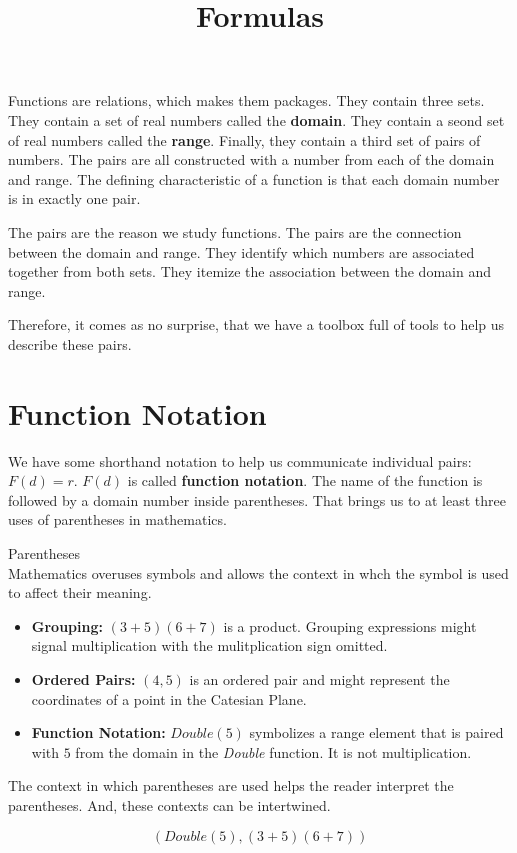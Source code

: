 \documentclass{ximera}
\title{Formulas}
\begin{document}
\begin{abstract}

\end{abstract}
\maketitle


Functions are relations, which makes them packages.  They contain three sets.  They contain a set of real numbers called the \textbf{domain}.  They contain a seond set of real numbers called the \textbf{range}. Finally, they contain a third set of pairs of numbers.  The pairs are all constructed with a number from each of the domain and range. The defining characteristic of a function is that each domain number is in exactly one pair.

The pairs are the reason we study functions.  The pairs are the connection between the domain and range.  They identify which numbers are associated together from both sets. They itemize the association between the domain and range.

Therefore, it comes as no surprise, that we have a toolbox full of tools to help us describe these pairs.


\section{Function Notation}

We have some shorthand notation to help us communicate individual pairs: $F(d) = r$.  $F(d)$ is called \textbf{function notation}. The name of the function is followed by a domain number inside parentheses. That brings us to at least three uses of parentheses in mathematics.

\begin{notation}  Parentheses \\

Mathematics overuses symbols and allows the context in whch the symbol is used to affect their meaning.
	\begin{itemize}
		\item \textbf{Grouping:} $(3+5)(6+7)$ is a product.  Grouping expressions might signal multiplication with the mulitplication sign omitted.
		\item \textbf{Ordered Pairs:} $(4, 5)$ is an ordered pair and might represent the coordinates of a point in the Catesian Plane.
		\item \textbf{Function Notation:} $Double(5)$ symbolizes a range element that is paired with $5$ from the domain in the \textit{Double} function. It is not multiplication.
	\end{itemize}


The context in which parentheses are used helps the reader interpret the parentheses.  And, these contexts can be intertwined.

\[  (Double(5), (3+5)(6+7))    \]
\end{notation}
\end{document}
